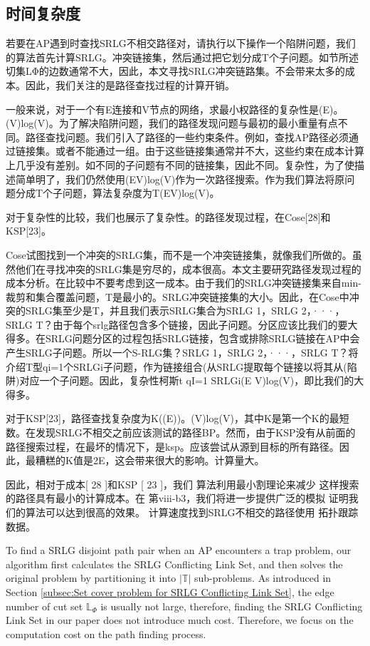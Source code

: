 

\subsection{时间复杂度}
若要在AP遇到时查找SRLG不相交路径对，请执行以下操作一个陷阱问题，我们的算法首先计算SRLG。冲突链接集，然后通过把它划分成T个子问题。如节所述切集LΦ的边数通常不大，因此，本文寻找SRLG冲突链路集。不会带来太多的成本。因此，我们关注的是路径查找过程的计算开销。

一般来说，对于一个有E连接和V节点的网络，求最小权路径的复杂性是(E)。(V)log(V)。为了解决陷阱问题，我们的路径发现问题与最初的最小重量有点不同。路径查找问题。我们引入了路径的一些约束条件。例如，查找AP路径必须通过链接集。或者不能通过一组。由于这些链接集通常并不大，这些约束在成本计算上几乎没有差别。如不同的子问题有不同的链接集，因此不同。复杂性，为了使描述简单明了，我们仍然使用(EV)log(V)作为一次路径搜索。作为我们算法将原问题分成T个子问题，算法复杂度为T(EV)log(V)。

对于复杂性的比较，我们也展示了复杂性。的路径发现过程，在Cose[28]和KSP[23]。

Cose试图找到一个冲突的SRLG集，而不是一个冲突链接集，就像我们所做的。虽然他们在寻找冲突的SRLG集是穷尽的，成本很高。本文主要研究路径发现过程的成本分析。在比较中不要考虑到这一成本。由于我们的SRLG冲突链接集来自min-裁剪和集合覆盖问题，T是最小的。SRLG冲突链接集的大小。因此，在Cose中冲突的SRLG集至少是T，并且我们表示SRLG集合为SRLG 1，SRLG 2，···，SRLG T？由于每个srlg路径包含多个链接，因此子问题。分区应该比我们的要大得多。在SRLG问题分区的过程包括SRLG链接，包含或排除SRLG链接在AP中会产生SRLG子问题。所以一个S-RLG集？SRLG 1，SRLG 2，···，SRLG T？将介绍T型qi=1个SRLGi子问题，作为链接组合(从SRLG提取每个链接以将其从(陷阱)对应一个子问题。因此，复杂性柯斯t qI=1 SRLGi(E V)log(V)，即比我们的大得多。

对于KSP[23]，路径查找复杂度为K((E))。(V)log(V)，其中K是第一个K的最短数。在发现SRLG不相交之前应该测试的路径BP。然而，由于KSP没有从前面的路径搜索过程，在最坏的情况下，是ksp。应该尝试从源到目标的所有路径。因此，最糟糕的K值是2E，这会带来很大的影响。计算量大。

因此，相对于成本[ 28 ]和KSP [ 23 ]，我们
算法利用最小割理论来减少
这样搜索的路径具有最小的计算成本。在
第viii-b3，我们将进一步提供广泛的模拟
证明我们的算法可以达到很高的效果。
计算速度找到SRLG不相交的路径使用
拓扑跟踪数据。

To find a SRLG disjoint path pair when an AP encounters a trap problem, our algorithm first calculates the SRLG Conflicting Link Set, and then solves the original problem by partitioning it into $|\mathbb{T}|$ sub-problems. As introduced in Section \ref{subsec:Set cover problem for SRLG Conflicting Link Set},  the edge number of cut set $\mathbb{L}_{\Phi}$ is usually not large, therefore, finding the SRLG Conflicting Link Set in our paper does not introduce much cost. Therefore, we focus on the computation cost on the path finding process.

